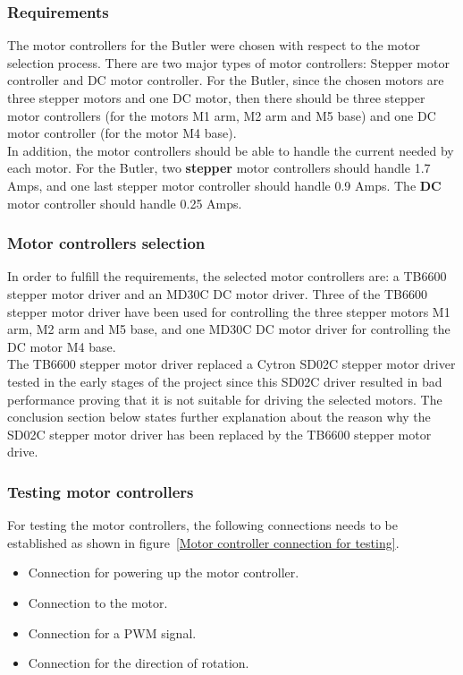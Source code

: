 \subsubsection{Requirements}
The motor controllers for the Butler were chosen with respect to the motor selection process. There are two major types of motor controllers: Stepper motor controller and DC motor controller. For the Butler, since the chosen motors are three stepper motors and one DC motor, then there should be three stepper motor controllers (for the motors M1 arm, M2 arm and M5 base) and one DC motor controller (for the motor M4 base).\\
In addition, the motor controllers should be able to handle the current needed by each motor. For the Butler, two \textbf{stepper} motor controllers should handle 1.7 Amps, and one last stepper motor controller should handle 0.9 Amps. The \textbf{DC} motor controller should handle 0.25 Amps.
\subsubsection{Motor controllers selection}

In order to fulfill the requirements, the selected motor controllers are: a TB6600\cite{Gpu2017} stepper motor driver and an MD30C\cite{ppp} DC motor driver. Three of the TB6600 stepper motor driver have been used for controlling the three stepper motors M1 arm, M2 arm and M5 base, and one MD30C DC motor driver for controlling the DC motor M4 base.\\
The TB6600 stepper motor driver replaced a Cytron SD02C\cite{123} stepper motor driver tested in the early stages of the project since this SD02C driver resulted in bad performance proving that it is not suitable for driving the selected motors. The conclusion section below states further explanation about the reason why the SD02C stepper motor driver has been replaced by the TB6600 stepper motor drive.


\subsubsection{Testing motor controllers}
For testing the motor controllers, the following connections needs to be established as shown in figure~\ref{Motor controller connection for testing}.
\begin{itemize}
    \item Connection for powering up the motor controller.
    \item Connection to the motor.
    \item Connection for a PWM signal.
    \item Connection for the direction of rotation.
\end{itemize}

